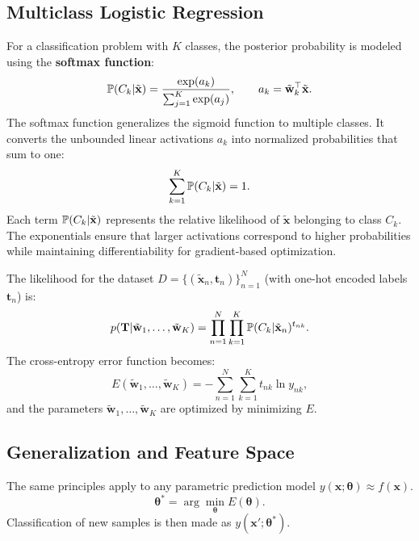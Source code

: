 \documentclass[10pt, letterpaper]{report}
\begin{document}
\subsection{Multiclass Logistic Regression}
For a classification problem with $K$ classes, the posterior probability is modeled using the \textbf{softmax function}:
\begin{equation}
	{\mathbb P}(C_k|\tilde{\mathbf x}) = 
	\frac{\exp(a_k)}{\sum_{j=1}^K \exp(a_j)}, 
	\qquad 
	a_k = \tilde{\mathbf w}_k^\top \tilde{\mathbf x}.
\end{equation}
\noindent
The softmax function generalizes the sigmoid function to multiple classes.  
It converts the unbounded linear activations $a_k$ into normalized probabilities that sum to one:
\begin{equation}
	\sum_{k=1}^K {\mathbb P}(C_k|\tilde{\mathbf x}) = 1.
\end{equation}
Each term ${\mathbb P}(C_k|\tilde{\mathbf x})$ represents the relative likelihood of $\tilde{\mathbf x}$ belonging to class $C_k$.  
The exponentials ensure that larger activations correspond to higher probabilities while maintaining differentiability for gradient-based optimization.

\bigskip
The likelihood for the dataset $D=\{(\tilde{\mathbf x}_n,\mathbf t_n)\}_{n=1}^N$ (with one-hot encoded labels $\mathbf t_n$) is:
\begin{equation}
	p(\mathbf T|\tilde{\mathbf w}_1,\dots,\tilde{\mathbf w}_K) 
	= \prod_{n=1}^N\prod_{k=1}^K 
	{\mathbb P}(C_k|\tilde{\mathbf x}_n)^{t_{nk}}.
\end{equation}
The cross-entropy error function becomes:
\begin{equation}
	E(\tilde{\mathbf w}_1,\dots,\tilde{\mathbf w}_K) 
	= -\sum_{n=1}^N\sum_{k=1}^K t_{nk}\ln y_{nk},
\end{equation}
and the parameters $\tilde{\mathbf w}_1,\dots,\tilde{\mathbf w}_K$ are optimized by minimizing $E$.


\subsection{Generalization and Feature Space}
The same principles apply to any parametric prediction model $y(\mathbf x;\boldsymbol\theta)\approx f(\mathbf x)$.
\begin{equation}
	\boldsymbol\theta^* = \arg\min_{\boldsymbol\theta} E(\boldsymbol\theta).
\end{equation}
Classification of new samples is then made as $y(\mathbf x';\boldsymbol\theta^*)$.
\end{document}
